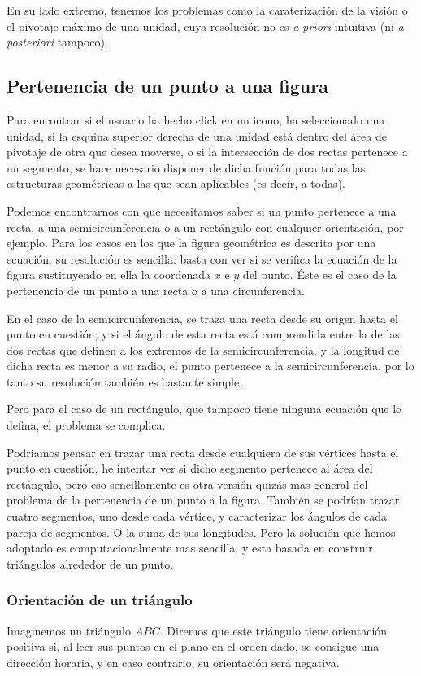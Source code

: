 En su lado extremo, tenemos los problemas como la caraterización de la
visión o el pivotaje máximo de una unidad, cuya resolución no es
\emph{a priori} intuitiva (ni \emph{a posteriori} tampoco).

\subsection{Pertenencia de un punto a una figura}
Para encontrar si el usuario ha hecho click en un icono, ha
seleccionado una unidad, si la esquina superior derecha de una unidad
está dentro del área de pivotaje de otra que desea moverse, o si la
intersección de dos rectas pertenece a un segmento, se hace necesario
disponer de dicha función para todas las estructuras geométricas a las
que sean aplicables (es decir, a todas).

Podemos encontrarnos con que necesitamos saber si un punto pertenece a una
recta, a una semicircunferencia o a un rectángulo con cualquier
orientación, por ejemplo. Para los casos en los que la figura
geométrica es descrita por una ecuación, su resolución es sencilla:
basta con ver si se verifica la ecuación de la figura sustituyendo en
ella la coordenada $x$ e $y$ del punto. Éste es el caso de la
pertenencia de un punto a una recta o a una circunferencia.

En el caso de la semicircunferencia, se traza una recta desde su
origen hasta el punto en cuestión, y si el ángulo de esta recta está
comprendida entre la de las dos rectas que definen a los extremos de
la semicircunferencia, y la longitud de dicha recta es menor a su
radio, el punto pertenece a la semicircunferencia, por lo tanto su
resolución también es bastante simple.

Pero para el caso de un rectángulo, que tampoco tiene ninguna ecuación
que lo defina, el problema se complica.

Podriamos pensar en trazar una recta desde cualquiera de sus vértices
hasta el punto en cuestión, he intentar ver si dicho segmento pertenece
al área del rectángulo, pero eso sencillamente es otra versión quizás mas
general del problema de la pertenencia de un punto a la
figura. También se podrían trazar cuatro segmentos, uno desde cada
vértice, y caracterizar los ángulos de cada pareja de segmentos. O la
suma de sus longitudes. Pero la solución que hemos adoptado es
computacionalmente mas sencilla, y esta basada en construir triángulos
alrededor de un punto.

\subsubsection{Orientación de un triángulo}
Imaginemos un triángulo $ABC$. Diremos que este triángulo tiene
orientación positiva si, al leer sus puntos en el plano en el orden
dado, se consigue una dirección horaria, y en caso contrario, su
orientación será negativa.

